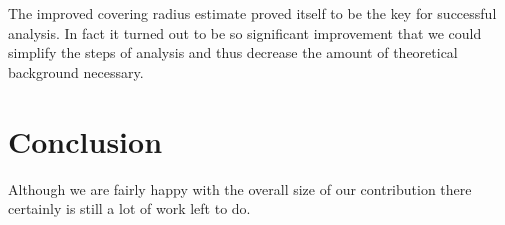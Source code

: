 \documentclass[text.tex]{subfiles}
\begin{document}
The improved covering radius estimate proved itself to be the key for successful analysis. In fact it turned out to be so significant improvement that we could simplify the steps of analysis and thus decrease the amount of theoretical background necessary. 

\section*{Conclusion}
Although we are fairly happy with the overall size of our contribution there certainly is still a lot of work left to do. 
\end{document}
